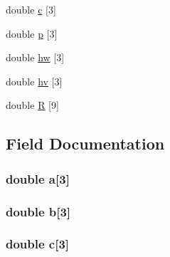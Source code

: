 \begin{DoxyCompactItemize}
\item 
double \hyperlink{struct_s_struct__u_l_i_n_k_adffe062455ce7fd9e485a126781af13f}{c} \mbox{[}3\mbox{]}
\item 
double \hyperlink{struct_s_struct__u_l_i_n_k_a9f2a829150c5753f56e91e5e3d9f6677}{p} \mbox{[}3\mbox{]}
\item 
double \hyperlink{struct_s_struct__u_l_i_n_k_a66047441f6f822ad4e7063f9bb4a4a3b}{hw} \mbox{[}3\mbox{]}
\item 
double \hyperlink{struct_s_struct__u_l_i_n_k_a5b6e47bde4ca802c5f52ba814b4b3c1f}{hv} \mbox{[}3\mbox{]}
\item 
double \hyperlink{struct_s_struct__u_l_i_n_k_ae9c91fd01a63a2b635a1796a4b713b86}{R} \mbox{[}9\mbox{]}
\end{DoxyCompactItemize}


\subsection{Field Documentation}
\hypertarget{struct_s_struct__u_l_i_n_k_a0910c359f02ae88168f5d9163f1e6b24}{
\subsubsection[{a}]{\setlength{\rightskip}{0pt plus 5cm}double a\mbox{[}3\mbox{]}}}\label{struct_s_struct__u_l_i_n_k_a0910c359f02ae88168f5d9163f1e6b24}
\hypertarget{struct_s_struct__u_l_i_n_k_a2afc6a29a6434245b3aef815cb9f62c0}{
\subsubsection[{b}]{\setlength{\rightskip}{0pt plus 5cm}double b\mbox{[}3\mbox{]}}}\label{struct_s_struct__u_l_i_n_k_a2afc6a29a6434245b3aef815cb9f62c0}
\hypertarget{struct_s_struct__u_l_i_n_k_adffe062455ce7fd9e485a126781af13f}{
\subsubsection[{c}]{\setlength{\rightskip}{0pt plus 5cm}double c\mbox{[}3\mbox{]}}}\label{struct_s_struct__u_l_i_n_k_adffe062455ce7fd9e485a126781af13f}
